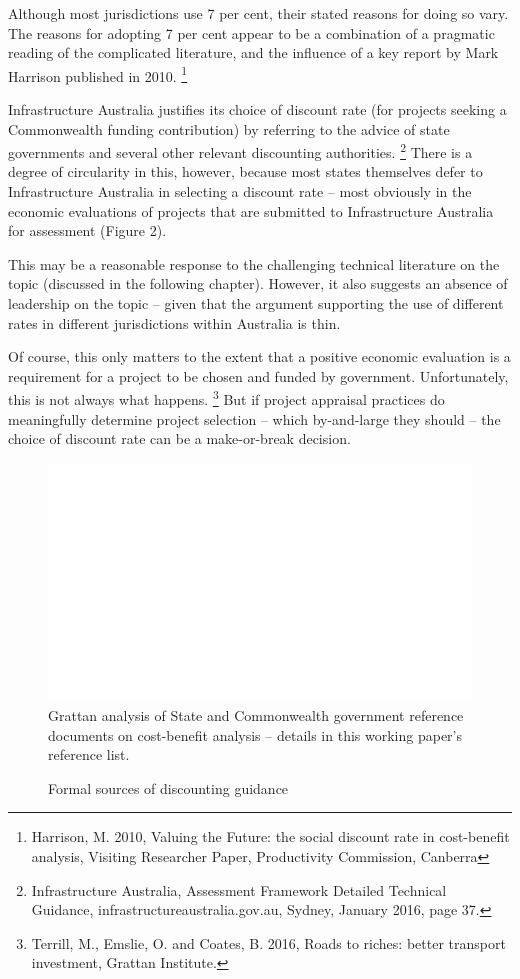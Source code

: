 Although most jurisdictions use 7 per cent, their stated reasons for doing so vary. The reasons for adopting 7 per cent appear to be a combination of a pragmatic reading of the complicated literature, and the influence of a key report by Mark Harrison published in 2010.%
    \footnote{Harrison, M. 2010, Valuing the Future: the social discount rate in cost-benefit analysis, Visiting Researcher Paper, Productivity Commission, Canberra}

Infrastructure Australia justifies its choice of discount rate (for projects seeking a Commonwealth funding contribution) by referring to the advice of state governments and several other relevant discounting authorities.%
    \footnote{Infrastructure Australia, Assessment Framework Detailed Technical Guidance, infrastructureaustralia.gov.au, Sydney, January 2016, page 37.}
There is a degree of circularity in this, however, because most states themselves defer to Infrastructure Australia in selecting a discount rate – most obviously in the economic evaluations of projects that are submitted to Infrastructure Australia for assessment (Figure 2). 

This may be a reasonable response to the challenging technical literature on the topic (discussed in the following chapter). However, it also suggests an absence of leadership on the topic – given that the argument supporting the use of different rates in different jurisdictions within Australia is thin.

Of course, this only matters to the extent that a positive economic evaluation is a requirement for a project to be chosen and funded by government. Unfortunately, this is not always what happens.%
    \footnote{Terrill, M., Emslie, O. and Coates, B. 2016, Roads to riches: better transport investment, Grattan Institute.}
But if project appraisal practices do meaningfully determine project selection -- which by-and-large they should -- the choice of discount rate can be a make-or-break decision. 

\begin{figure}
\caption{Formal sources of discounting guidance \label{<cross-reference key>}}%
\units{}
\includegraphics[page=5]{Charts/ChartPackDiscountRates.pdf}
%
{Grattan analysis of State and Commonwealth government reference documents on cost-benefit analysis – details in this working paper’s reference list.}
\end{figure}
